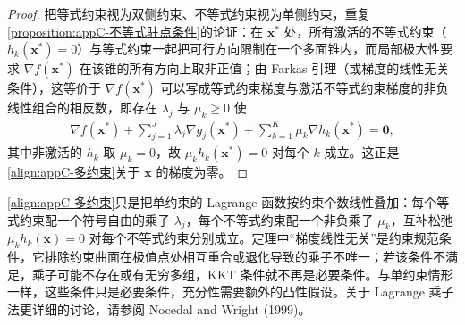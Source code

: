 \documentclass[../main.tex]{subfiles}
\begin{document}
\begin{proof}
把等式约束视为双侧约束、不等式约束视为单侧约束，重复\cref{proposition:appC-不等式驻点条件}的论证：在 $\bm{x}^{*}$ 处，所有激活的不等式约束（$h_k(\bm{x}^{*})=0$）与等式约束一起把可行方向限制在一个多面锥内，而局部极大性要求 $\nabla f(\bm{x}^{*})$ 在该锥的所有方向上取非正值；由 Farkas 引理（或梯度的线性无关条件），这等价于 $\nabla f(\bm{x}^{*})$ 可以写成等式约束梯度与激活不等式约束梯度的非负线性组合的相反数，即存在 $\lambda_j$ 与 $\mu_k\geqslant0$ 使
\begin{align*}
 \nabla f(\bm{x}^{*})+\sum_{j=1}^{J}\lambda_j\nabla g_j(\bm{x}^{*})+\sum_{k=1}^{K}\mu_k\nabla h_k(\bm{x}^{*})=\bm{0},
\end{align*}
其中非激活的 $h_k$ 取 $\mu_k=0$，故 $\mu_k h_k(\bm{x}^{*})=0$ 对每个 $k$ 成立。这正是\eqref{align:appC-多约束}关于 $\bm{x}$ 的梯度为零。
\end{proof}

\begin{remark}
\eqref{align:appC-多约束}只是把单约束的 Lagrange 函数按约束个数线性叠加：每个等式约束配一个符号自由的乘子 $\lambda_j$，每个不等式约束配一个非负乘子 $\mu_k$，互补松弛 $\mu_k h_k(\bm{x})=0$ 对每个不等式约束分别成立。定理中“梯度线性无关”是约束规范条件，它排除约束曲面在极值点处相互重合或退化导致的乘子不唯一；若该条件不满足，乘子可能不存在或有无穷多组，KKT 条件就不再是必要条件。与单约束情形一样，这些条件只是必要条件，充分性需要额外的凸性假设。关于 Lagrange 乘子法更详细的讨论，请参阅 Nocedal and Wright (1999)。
\end{remark}
\end{document}

